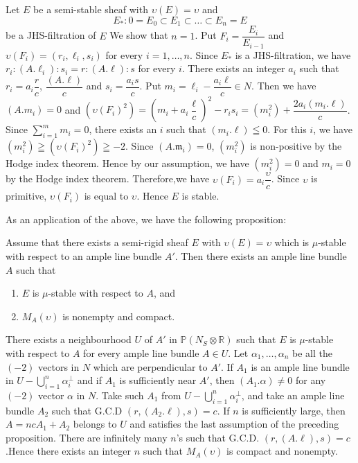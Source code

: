 \begin{Proof}
Let $E$ be a semi-stable sheaf with $\upsilon(E)=\upsilon$ and 
$$
E_{\ast}:0=E_0\subset E_1\subset\ldots \subset E_n=E
$$
be a JHS-filtration of $E$ We show that $n=1$. Put
$F_i=\dfrac{E_i}{E_{i-1}}$ and $\upsilon(F_i)=(r_i,\ell_i,s_i)$ for
every $i=1,\ldots,n$. Since $E_{\ast}$ is a JHS-filtration, we have
$r_i:(A.\ell_i):s_i=r:(A.\ell):s$ for every $i$. There exists an
integer $a_i$ such that $r_i=a_i\dfrac{r}{c}$, $\dfrac{(A.\ell)}{c}$
and $s_i=\dfrac{a_is}{c}$. Put $m_i=\ell_i-\dfrac{a_i\ell}{c}\in
N$. Then we have $(A.m_i)=0$ and
$\left(\upsilon(F_i)^{2}\right)=\left(m_i+a_i\dfrac{\ell}{c}\right)^{2}-r_is_i=\left(m^{2}_i\right)+\dfrac{2a_i(m_i.\ell)}{c}$. Since
$\sum\limits_{i=1}^{m}m_i=0$, there exists an $i$ such that
$(m_i.\ell)\leqq 0$. For this $i$, we have
$\left(m^{2}_i\right)\geqq \left(\upsilon(F_i)^{2}\right)\geqq-2$. Since
$(A.\mathfrak{m}_i)=0$, $\left(m^{2}_i\right)$ is non-positive by the
Hodge index theorem. Hence by our assumption, we have
$\left(m^{2}_i\right)=0$ and $m_i=0$ by the Hodge index
theorem. Therefore,\pageoriginale we have
$\upsilon(F_i)=a_i\dfrac{\upsilon}{c}$. Since $\upsilon$ is primitive,
$\upsilon(F_i)$ is equal to $\upsilon$. Hence $E$ is stable.
\enprf
\end{Proof}

As an application of the above, we have the following proposition: 

\begin{Prop}\label{Prop4.3}
Assume that there exists a semi-rigid sheaf $E$ with
$\upsilon(E)=\upsilon$ which is $\mu$-stable with respect to an ample
line bundle $A'$. Then  there exists an ample line bundle $A$ such
that 
\begin{enumerate}
\renewcommand{\labelenumi}{(\theenumi)}
\item $E$ is $\mu$-stable with respect to $A$, and

\item $M_A(\upsilon)$ is nonempty and compact. 
\end{enumerate}
\end{Prop}

\begin{Proof}
There exists a neighbourhood $U$ of $A'$ in
$\mathbb{P}(N_S\otimes \mathbb{R})$ such that $E$ is $\mu$-stable with
respect to $A$ for every ample line bundle $A\in U$. Let
$\alpha_1,\ldots,\alpha_n$ be all the $(-2)$ vectors in $N$ which are
perpendicular to $A'$. If $A_1$ is an ample line bundle in
$U-\bigcup\limits^{n}_{i=1}\alpha^{\perp}_i$ and if $A_1$ is sufficiently
near $A'$, then $(A_1.\alpha)\neq 0$ for any $(-2)$ vector $\alpha$ in
$N$. Take such $A_1$ from
$U-\bigcup\limits_{i=1}^{n}\alpha^{\perp}_i$, and take an ample line
bundle $A_2$ such that G.C.D $(r,(A_2.\ell),s)=c$. If $n$ is
sufficiently large, then $A=n c A_1+A_2$ belongs to $U$ and satisfies
the last assumption of the preceding proposition. There are infinitely
many $n$'s such that G.C.D. $(r,(A.\ell),s)=c$.\pageoriginale Hence there exists
an integer $n$ such that $M_A(\upsilon)$ is compact and nonempty.
\enprf
\end{Proof}


